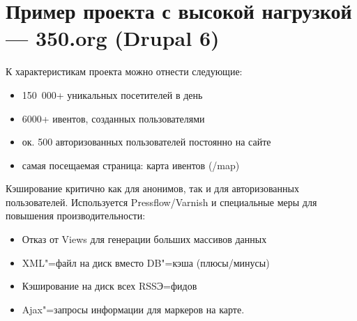 \documentclass[10pt, a5paper]{article}
\begin{document}
\section*{Пример проекта с высокой нагрузкой --- 350.org (Drupal 6)}

К характеристикам проекта можно отнести следующие: 
\begin{itemize}
	\item 150 000+  уникальных посетителей в день
	\item 6000+ ивентов, созданных пользователями
	\item ок. 500 авторизованных пользователей постоянно на сайте
	\item самая посещаемая страница: карта ивентов (/map)
\end{itemize}

Кэширование критично как для анонимов, так и для авторизованных пользователей. Используется Pressflow/Varnish и специальные меры для повышения производительности:
\longpage
\begin{itemize}
	\item Отказ от Views для генерации больших массивов данных
	\item XML"=файл на диск вместо DB"=кэша (плюсы/минусы)
	\item Кэширование на диск всех RSSЭ=фидов
	\item Ajax"=запросы информации для маркеров на карте.
\end{itemize}
\end{document}
